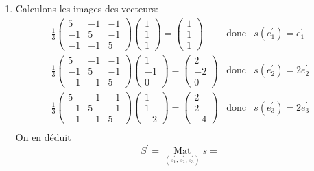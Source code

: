 \begin{enumerate}
\begin{enumerate}
\item Calculons les images des vecteurs:
\begin{eqnarray*}
 \frac{1}{3}\left( \begin{array}{ccc}
5 & -1 & -1 \\
-1 & 5 & -1 \\
-1 & -1 & 5
        \end{array}\right) 
 \left( \begin{array}{c}
1 \\ 1 \\ 1
\end{array}
\right)= \left( \begin{array}{c}
1 \\ 1 \\ 1
\end{array}
\right) &\mathrm{donc}& s(e^{\prime}_1)=e^{\prime}_1  \\
 \frac{1}{3}\left( \begin{array}{ccc}
5 & -1 & -1 \\
-1 & 5 & -1 \\
-1 & -1 & 5
        \end{array}\right) 
 \left( \begin{array}{c}
1 \\ -1 \\ 0
\end{array}
\right)= \left( \begin{array}{c}
2 \\ -2 \\ 0
\end{array}
\right) &\mathrm{donc}& s(e^{\prime}_2)=2e^{\prime}_2  \\
 \frac{1}{3}\left( \begin{array}{ccc}
5 & -1 & -1 \\
-1 & 5 & -1 \\
-1 & -1 & 5
        \end{array}\right) 
 \left( \begin{array}{c}
1 \\ 1 \\ -2
\end{array}
\right)= \left( \begin{array}{c}
2 \\ 2 \\ -4
\end{array}
\right) &\mathrm{donc}& s(e^{\prime}_3)=2e^{\prime}_3  \\
\end{eqnarray*}
On en déduit
\[S^{\prime}=\underset{(e^{\prime}_1,e^{\prime}_2,e^{\prime}_3)}{\mathop{\mathrm{Mat}}}s =
\]
\end{enumerate}
\end{enumerate}
